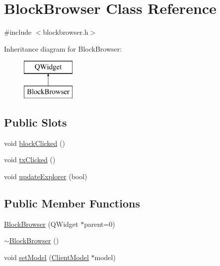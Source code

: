 \hypertarget{class_block_browser}{}\section{Block\+Browser Class Reference}
\label{class_block_browser}


{\ttfamily \#include $<$blockbrowser.\+h$>$}

Inheritance diagram for Block\+Browser\+:\begin{figure}[H]
\begin{center}
\leavevmode
\includegraphics[height=2.000000cm]{class_block_browser}
\end{center}
\end{figure}
\subsection*{Public Slots}
\begin{DoxyCompactItemize}
\item 
void \hyperlink{class_block_browser_a385f5e10646d9beebaba18e64f167888}{block\+Clicked} ()
\item 
void \hyperlink{class_block_browser_ae99275319759f5812adaada35dbc5e50}{tx\+Clicked} ()
\item 
void \hyperlink{class_block_browser_ad6d698399c521b503106f1d768a76f32}{update\+Explorer} (bool)
\end{DoxyCompactItemize}
\subsection*{Public Member Functions}
\begin{DoxyCompactItemize}
\item 
\hyperlink{class_block_browser_aaabcd986f78a79e0e65dce85e9cabb1a}{Block\+Browser} (Q\+Widget $\ast$parent=0)
\item 
\hyperlink{class_block_browser_ae9435339ce465a054636210b9abc0d5f}{$\sim$\+Block\+Browser} ()
\item 
void \hyperlink{class_block_browser_a2706e5abfeaccd5e97ebd0788fba4859}{set\+Model} (\hyperlink{class_client_model}{Client\+Model} $\ast$model)
\end{DoxyCompactItemize}


